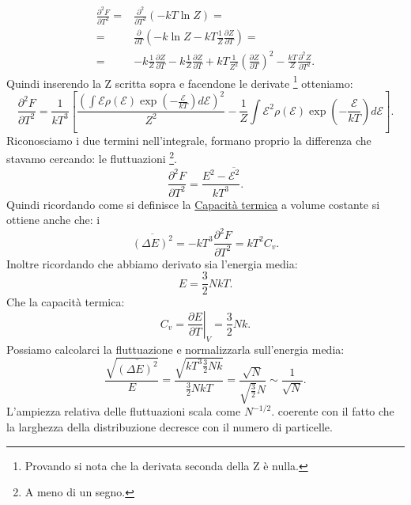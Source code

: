 \begin{align}
	\frac{\partial ^2 F}{\partial T^2} =& \frac{\partial ^2}{\partial T^2} \left( -kT \ln Z \right) =\\
	=&\frac{\partial }{\partial T} \left( -k\ln Z -kT \frac{1}{Z} \frac{\partial Z}{\partial T}  \right) =\\
	=&-k \frac{1}{Z}\frac{\partial Z}{\partial T} 
		- k \frac{1}{Z}\frac{\partial Z}{\partial T} 
		+ kT \frac{1}{Z^2}\left( \frac{\partial Z}{\partial T}  \right) ^2 
		- \frac{kT}{Z}\frac{\partial ^2 Z}{\partial T^2} 
.\end{align}
Quindi inserendo la Z scritta sopra e facendone le derivate \footnote{Provando si nota che la derivata seconda della Z è nulla.} otteniamo:
\[
	\frac{\partial ^2 F}{\partial T^2} = \frac{1}{kT^3} 
	\left[
		\frac{\left( \int \mathcal{E}\rho(\mathcal{E})\exp\left( -\frac{\mathcal{E}}{kT}  \right)d\mathcal{E} \right)^2  }{Z^2}  
		- \frac{1}{Z}\int \mathcal{E}^2\rho\left( \mathcal{E} \right) \exp\left( - \frac{\mathcal{E}}{kT} \right)d\mathcal{E}  
	\right]
.\] 
Riconosciamo i due termini nell'integrale, formano proprio la differenza che stavamo cercando: le fluttuazioni \footnote{A meno di un segno.}.
\[
	\frac{\partial ^2 F}{\partial T^2} = \frac{E^2-\overline{\mathcal{E}^2}}{kT^3}
.\] 
Quindi ricordando come si definisce la \hyperref[eq:capacita-termica]{Capacità termica} a volume costante si ottiene anche che: 
i
\[
	\overline{\left( \Delta E \right) ^2} = -kT^3 \frac{\partial ^2 F}{\partial T^2} = kT^2 C_{v}
.\] 
Inoltre ricordando che abbiamo derivato sia l'energia media:
\[
	E = \frac{3}{2}N kT
.\] 
Che la capacità termica:
\[
	C_{v} = \left.\frac{\partial E}{\partial T} \right|_{V} =  \frac{3}{2}Nk
.\] 
Possiamo calcolarci la fluttuazione e normalizzarla sull'energia media:
\[
	\frac{\sqrt{\overline{\left( \Delta E \right) ^2}} }{E} = \frac{\sqrt{kT^3 \frac{3}{2}Nk} }{\frac{3}{2}NkT} = \frac{\sqrt{N} }{\sqrt{\frac{3}{2}}N}\sim \frac{1}{\sqrt{N} }
.\] 
L'ampiezza relativa delle fluttuazioni scala come $N^{-1 /2 }$. coerente con il fatto che la larghezza della distribuzione decresce con il numero di particelle.\\
